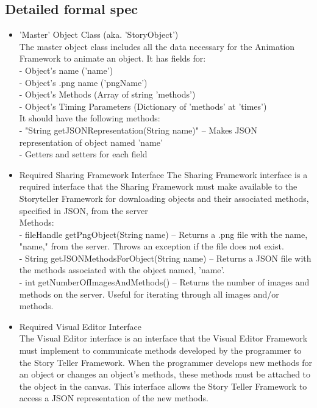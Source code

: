 \documentclass[12pt]{article}
\begin{document}
\subsection{Detailed formal spec}
\begin{itemize}
	\item 'Master' Object Class (aka. 'StoryObject') \\
	The master object class includes all the data necessary for the Animation Framework to
	animate an object. It has fields for: \\

	\indent - Object's name ('name') \\
	\indent - Object's .png name ('pngName') \\
	\indent - Object's Methods (Array of string 'methods') \\
	\indent - Object's Timing Parameters (Dictionary of 'methods' at 'times') \\
	
	It should have the following methods: \\
	\indent - "String getJSONRepresentation(String name)" -- Makes JSON representation of object named 'name' \\
	\indent - Getters and setters for each field \\
	
	\item Required Sharing Framework Interface
	The Sharing Framework interface is a required interface that the Sharing Framework must make available to the Storyteller Framework for downloading objects and their associated methods, specified in JSON, from the server \\
	
	Methods: \\
	\indent - fileHandle getPngObject(String name) -- Returns a .png file with the name, "name," from the server. Throws an exception if the file does not exist. \\
	\indent - String getJSONMethodsForObject(String name) -- Returns a JSON file with the methods associated with the object named, 'name'. \\
	\indent - int getNumberOfImagesAndMethods() -- Returns the number of images and methods on the server. Useful for iterating through all images and/or methods. \\
	
	\item Required Visual Editor Interface \\
	The Visual Editor interface is an interface that the Visual Editor Framework must implement to communicate methods developed by the programmer to the Story Teller Framework. When the programmer develops new methods for an object or changes an object's methods, these methods must be attached to the object in the canvas. This interface allows the Story Teller Framework to access a JSON representation of the new methods. \\
	

\end{itemize}
\end{document}
